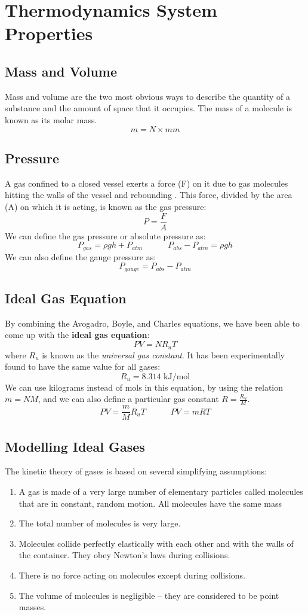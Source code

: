 \documentclass[11pt]{article}
\begin{document}
\section{Thermodynamics System Properties}
\subsection{Mass and Volume}
Mass and volume are the two most obvious ways to describe the quantity of a substance and the amount of space that it occupies. The mass of a molecule is known as its molar mass.
$$m = N \times mm   $$
\subsection{Pressure}
A gas confined to a closed vessel exerts a force (F) on it due to gas molecules hitting the walls of the vessel and rebounding . This force, divided by the area (A) on which it is acting, is known as the gas pressure:
$$ P = \frac{F}{A} $$
We can define the gas pressure or absolute pressure as:
$$P_{gas} = \rho gh + P_{atm} \quad \quad \quad P_{abs} - P_{atm} = \rho gh $$
We can also define the gauge pressure as:
$$ P_{gauge} = P_{abs} - P_{atm}$$
\subsection{Ideal Gas Equation}
By combining the Avogadro, Boyle, and Charles equations, we have been able to come up with the \textbf{ideal gas equation}:
$$ PV = NR_uT$$ 
where $R_u$ is known as the \textit{universal gas constant}. It has been experimentally found to have the same value for all gases:
$$ R_u = 8.314 \text{ kJ/mol} $$
We can use kilograms instead of mols in this equation, by using the relation $m = NM$, and we can also define a particular gas constant $R = \frac{R_u}{M}$.
$$ PV = \frac{m}{M}R_uT \quad \quad \quad PV = mRT$$
\subsection{Modelling Ideal Gases}
The kinetic theory of gases is based on several simplifying assumptions:
\begin{enumerate}
\item A gas is made of a very large number of elementary particles called molecules that are in constant, random motion. All molecules have the same mass
\item The total number of molecules is very large. 
\item Molecules collide perfectly elastically with each other and with the walls of the container. They obey Newton’s laws during collisions. 
\item There is no force acting on molecules except during collisions. 
\item The volume of molecules is negligible – they are considered to be point masses.
\end{enumerate}
\end{document}
